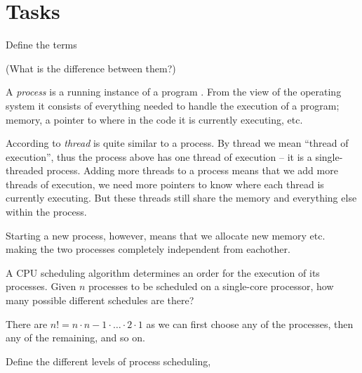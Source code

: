 \documentclass[a4paper,nocourse]{miunasgn}
\begin{document}
\section{Tasks}
\label{sec:Tasks}
\begin{questions}
	\question\label{q:processthread}
	Define the terms
	(What is the difference between them?)
	\begin{solution}
		A \emph{process} is a running instance of a program \citep[p.  
		102]{Silberschatz2009osc}.
		From the view of the operating system it consists of everything needed to 
		handle the execution of a program; memory, a pointer to where in the code 
		it is currently executing, etc.

		According to \citet[pp. 153--154]{Silberschatz2009osc} \emph{thread} is 
		quite similar to a process.
		By thread we mean ``thread of execution'', thus the process above has one 
		thread of execution -- it is a single-threaded process.
		Adding more threads to a process means that we add more threads of 
		execution, we need more pointers to know where each thread is currently 
		executing.
		But these threads still share the memory and everything else within the 
		process.

		Starting a new process, however, means that we allocate new memory etc.  
		making the two processes completely independent from eachother.
	\end{solution}


	\question\label{q:scheduling}
	A CPU scheduling algorithm determines an order for the execution of its 
	processes.
	Given \(n\) processes to be scheduled on a single-core processor, how many 
	possible different schedules are there?
	\begin{solution}
		There are \(n! = n\cdot n-1\cdot \ldots\cdot 2\cdot 1\) as we can first 
		choose any of the processes, then any of the remaining, and so on.
	\end{solution}

	\question\label{q:scheduler}
	Define the different levels of process scheduling,
	\begin{parts}

\end{parts}
\end{questions}
\end{document}
